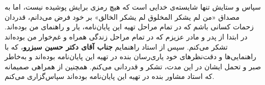 
\chapter*{}
\thispagestyle{empty}
\indent
\vskip1cm


سپاس و ستایش تنها شایسته‌ی خدایی است که هیچ‌ رمزی برایش پوشیده نیست، اما به مصداق «من لم یشکر المخلوق لم یشکر الخالق» بر خود فرض می‌دانم، قدر‌دان زحمات کسانی باشم که در تمام مراحل تهیه‌ این پایان‌نامه، یار و راهنمای من بوده‌اند. در ابتدا از پدر و مادر عزیزم که در تمام مراحل زندگی همراه و غم‌خوار من بوده‌اند تشکر می‌کنم. سپس از  استاد راهنمایم 
\textbf{جناب آقای دکتر حسین سبزرو}، 
که با راهنمایی‌ها و دقت‌نظر‌های خود یاری‌رسان بنده در تهیه این پایان‌نامه بوده‌اند و به‌خاطر صبر و تحمل ایشان در این مدت، تشکر و قدردانی می‌کنم. همچنین از همراهی صمیمانه  
\textbf{}
که استاد مشاور بنده در تهیه‌ این پایان‌نامه بوده‌اند سپاس‌گزاری می‌کنم. 
  

 
